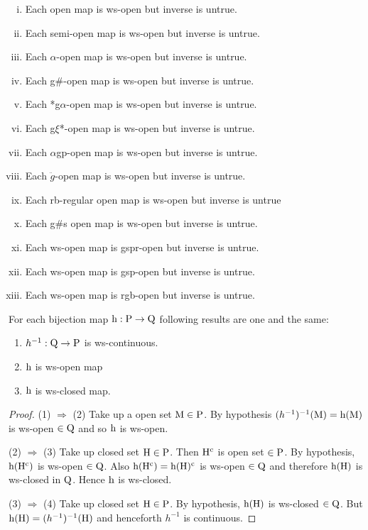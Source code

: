 \begin{thm}\label{thm4.2.38}
\begin{enumerate}[(i)]
\item Each open map is ws-open but inverse is untrue.
\item Each semi-open map is ws-open but inverse is untrue.
\item Each $\alpha$-open map is ws-open but inverse is untrue.
\item Each g\#-open map is ws-open but inverse is untrue.
\item Each *g$\alpha$-open map is ws-open but inverse is untrue.
\item Each g$\xi$*-open map is ws-open but inverse is untrue.
\item Each $\alpha$gp-open map is ws-open but inverse is untrue.
\item Each $\ddot{g}$-open map is ws-open but inverse is untrue.
\item Each rb-regular open map is ws-open but inverse is untrue
\item Each g\#s open map is ws-open but inverse is untrue.
\item Each ws-open map is gspr-open but inverse is untrue.
\item Each ws-open map is gsp-open but inverse is untrue.
\item Each ws-open map is rgb-open but inverse is untrue.
\end{enumerate}
\end{thm}

\begin{thm}\label{thm4.2.39}
For each bijection map $\mathrm{h}: \mathrm{P} \to \mathrm{Q}$ following results are one and the same:
\begin{enumerate}[(1)]
\item $h^{-1} : \mathrm{Q} \to \mathrm{P}$ is ws-continuous.
\item $\mathrm{h}$ is ws-open map
\item $\mathrm{h}$ is ws-closed map.
\end{enumerate}
\end{thm}

\begin{proof}
(1) $\Rightarrow$ (2) Take up a open set $\mathrm{M} \in \mathrm{P}$. By hypothesis $(h^{-1})^{-1}(\mathrm{M}) = \mathrm{h} (\mathrm{M})$ is ws-open $\in \mathrm{Q}$ and so $\mathrm{h}$ is ws-open.

(2) $\Rightarrow$ (3) Take up closed set $\mathrm{H}\in \mathrm{P}$. Then $\mathrm{H}^{\text{c}}$ is open set $\in \mathrm{P}$. By hypothesis, $\mathrm{h} (\mathrm{H}^{\text{c}})$ is ws-open $\in \mathrm{Q}$. Also $\mathrm{h} (\mathrm{H}^{\text{c}}) = \mathrm{h} (\mathrm{H})^{\text{c}}$ is ws-open $\in \mathrm{Q}$ and therefore $\mathrm{h}(\mathrm{H})$ is ws-closed in $\mathrm{Q}$. Hence $\mathrm{h}$ is ws-closed.

(3) $\Rightarrow$ (4) Take up closed set $\mathrm{H} \in \mathrm{P}$. By hypothesis, $\mathrm{h}(\mathrm{H})$ is ws-closed $\in \mathrm{Q}$. But $\mathrm{h} (\mathrm{H}) = (h^{-1})^{-1}(\mathrm{H})$ and henceforth $h^{-1}$ is continuous.
\end{proof}

